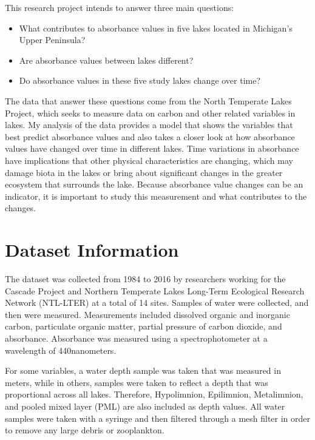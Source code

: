 \documentclass[12pt,]{article}
\providecommand{\tightlist}{%
  \setlength{\itemsep}{0pt}\setlength{\parskip}{0pt}}
\begin{document}
This research project intends to answer three main questions:

\begin{itemize}
\tightlist
\item
  What contributes to absorbance values in five lakes located in
  Michigan's Upper Peninsula?
\item
  Are absorbance values between lakes different?
\item
  Do absorbance values in these five study lakes change over time?
\end{itemize}

The data that answer these questions come from the North Temperate Lakes
Project, which seeks to measure data on carbon and other related
variables in lakes. My analysis of the data provides a model that shows
the variables that best predict absorbance values and also takes a
closer look at how absorbance values have changed over time in different
lakes. Time variations in absorbance have implications that other
physical characteristics are changing, which may damage biota in the
lakes or bring about significant changes in the greater ecosystem that
surrounds the lake. Because absorbance value changes can be an
indicator, it is important to study this measurement and what
contributes to the changes.

\newpage

\section{Dataset Information}\label{dataset-information}

The dataset was collected from 1984 to 2016 by researchers working for
the Cascade Project and Northern Temperate Lakes Long-Term Ecological
Research Network (NTL-LTER) at a total of 14 sites. Samples of water
were collected, and then were measured. Measurements included dissolved
organic and inorganic carbon, particulate organic matter, partial
pressure of carbon dioxide, and absorbance. Absorbance was measured
using a spectrophotometer at a wavelength of 440nanometers.

For some variables, a water depth sample was taken that was measured in
meters, while in others, samples were taken to reflect a depth that was
proportional across all lakes. Therefore, Hypolimnion, Epilimnion,
Metalimnion, and pooled mixed layer (PML) are also included as depth
values. All water samples were taken with a syringe and then filtered
through a mesh filter in order to remove any large debris or
zooplankton.
\end{document}
